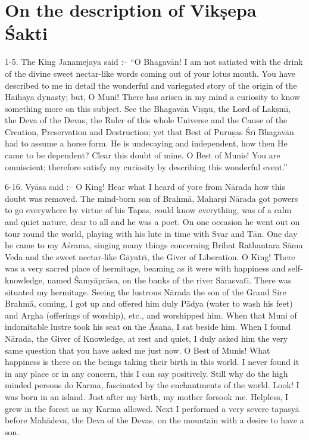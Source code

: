 \chapter{On the description of Vik\d{s}epa \'Sakti}

1-5. The King Janamejaya said :-- ``O Bhagav\=an! I am not satiated with the drink of the divine sweet nectar-like words coming out of your lotus mouth. You have described to me in detail the wonderful and variegated story of the origin of the Haihaya dynasty; but, O Muni! There has arisen in my mind a curiosity to know something more on this subject. See the Bhagav\=an Vi\d{s}\d{n}u, the Lord of Lak\d{s}m\={\i}, the Deva of the Devas, the Ruler of this whole Universe and the Cause of the Creation, Preservation and Destruction; yet that Best of Puru\d{s}as \'Sr\={\i} Bhagav\=an had to assume a horse form. He is undecaying and independent, how then He came to be dependent? Clear this doubt of mine. O Best of Munis! You are omniscient; therefore satisfy my curiosity by describing this wonderful event.''

6-16. Vy\=asa said :-- O King! Hear what I heard of yore from N\=arada how this doubt was removed. The mind-born son of Brahm\=a, Mahar\d{s}i N\=arada got powers to go everywhere by virtue of his Tapas, could know everything, was of a calm and quiet nature, dear to all and he was a poet. On one occasion he went out on tour round the world, playing with his lute in time with Svar and T\=an. One day he came to my \=A\'srama, singing many things concerning Brihat Rathantara S\=ama Veda and the sweet nectar-like G\=ayatr\={\i}, the Giver of Liberation. O King! There was a very sacred place of hermitage, beaming as it were with happiness and self-knowledge, named \'Samy\=apr\=asa, on the banks of the river Sarasvat\={\i}. There was situated my hermitage. Seeing the lustrous N\=arada the son of the Grand Sire Brahm\=a, coming, I got up and offered him duly P\=adya (water to wash his feet) and Argha (offerings of worship), etc., and worshipped him. When that Muni of indomitable lustre took his seat on the \=Asana, I sat beside him. When I found N\=arada, the Giver of Knowledge, at rest and quiet, I duly asked him the very same question that you have asked me just now. O Best of Munis! What happiness is there on the beings taking their birth in this world. I never found it in any place or in any concern, this I can say positively. Still why do the high minded persons do Karma, fascinated by the enchantments of the world. Look! I was born in an island. Just after my birth, my mother forsook me. Helpless, I grew in the forest as my Karma allowed. Next I performed a very severe tapasy\=a before Mah\=adeva, the Deva of the Devas, on the mountain with a desire to have a son.

